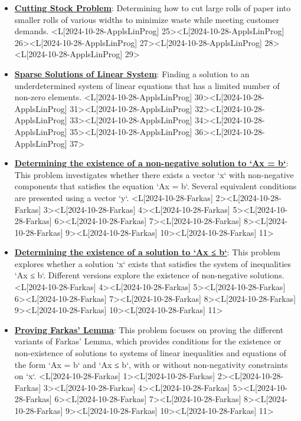 \documentclass{article}%
\begin{document}
\begin{itemize}[[leftmargin=*]]
\item \href{https://www.math.purdue.edu/~yipn/421/2024-10-28-ApplsLinProg.pdf#page=25}{\textbf{Cutting Stock Problem}}: Determining how to cut large rolls of paper into smaller rolls of various widths to minimize waste while meeting customer demands. <L[2024-10-28-ApplsLinProg] 25><L[2024-10-28-ApplsLinProg] 26><L[2024-10-28-ApplsLinProg] 27><L[2024-10-28-ApplsLinProg] 28><L[2024-10-28-ApplsLinProg] 29>%
\item \href{https://www.math.purdue.edu/~yipn/421/2024-10-28-ApplsLinProg.pdf#page=30}{\textbf{Sparse Solutions of Linear System}}: Finding a solution to an underdetermined system of linear equations that has a limited number of non-zero elements. <L[2024-10-28-ApplsLinProg] 30><L[2024-10-28-ApplsLinProg] 31><L[2024-10-28-ApplsLinProg] 32><L[2024-10-28-ApplsLinProg] 33><L[2024-10-28-ApplsLinProg] 34><L[2024-10-28-ApplsLinProg] 35><L[2024-10-28-ApplsLinProg] 36><L[2024-10-28-ApplsLinProg] 37>%
\end{itemize}%
\begin{itemize}[[leftmargin=*]]%
\item \href{https://www.math.purdue.edu/~yipn/421/2024-10-28-Farkas.pdf#page=2}{\textbf{Determining the existence of a non{-}negative solution to `Ax = b`}}: This problem investigates whether there exists a vector `x` with non-negative components that satisfies the equation `Ax = b`. Several equivalent conditions are presented using a vector `y`. <L[2024-10-28-Farkas] 2><L[2024-10-28-Farkas] 3><L[2024-10-28-Farkas] 4><L[2024-10-28-Farkas] 5><L[2024-10-28-Farkas] 6><L[2024-10-28-Farkas] 7><L[2024-10-28-Farkas] 8><L[2024-10-28-Farkas] 9><L[2024-10-28-Farkas] 10><L[2024-10-28-Farkas] 11>%
\item \href{https://www.math.purdue.edu/~yipn/421/2024-10-28-Farkas.pdf#page=4}{\textbf{Determining the existence of a solution to `Ax ≤ b`}}: This problem explores whether a solution `x` exists that satisfies the system of inequalities `Ax ≤ b`. Different versions explore the existence of non-negative solutions. <L[2024-10-28-Farkas] 4><L[2024-10-28-Farkas] 5><L[2024-10-28-Farkas] 6><L[2024-10-28-Farkas] 7><L[2024-10-28-Farkas] 8><L[2024-10-28-Farkas] 9><L[2024-10-28-Farkas] 10><L[2024-10-28-Farkas] 11>%
\item \href{https://www.math.purdue.edu/~yipn/421/2024-10-28-Farkas.pdf#page=1}{\textbf{Proving Farkas' Lemma}}: This problem focuses on proving the different variants of Farkas' Lemma, which provides conditions for the existence or non-existence of solutions to systems of linear inequalities and equations of the form `Ax = b` and `Ax ≤ b`, with or without non-negativity constraints on `x`. <L[2024-10-28-Farkas] 1><L[2024-10-28-Farkas] 2><L[2024-10-28-Farkas] 3><L[2024-10-28-Farkas] 4><L[2024-10-28-Farkas] 5><L[2024-10-28-Farkas] 6><L[2024-10-28-Farkas] 7><L[2024-10-28-Farkas] 8><L[2024-10-28-Farkas] 9><L[2024-10-28-Farkas] 10><L[2024-10-28-Farkas] 11>%
\end{itemize}%
\end{document}
